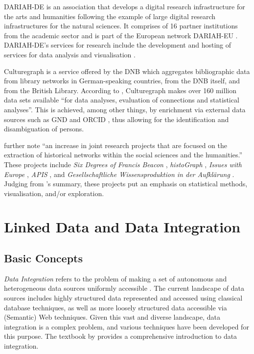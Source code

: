 DARIAH-DE \autocite{DariahDE} is an association that develops
a digital research infrastructure for the arts and humanities
following the example of large digital research infrastructures for the natural sciences.
It comprises of 16 partner institutions from the academic sector
and is part of the European network DARIAH-EU \autocite{DariahEU}.
DARIAH-DE's services for research include
the development and hosting of services for data analysis and visualisation
\autocite{WikiDariahDE}.

Culturegraph \autocite{Vorndran2018,Culturegraph} is a service offered by the
\gls{DNB} which aggregates bibliographic data 
from library networks in German-speaking countries,
from the \gls{DNB} itself, and from the British Library.
According to \textcite{Vorndran2018}, Culturegraph makes over 160 million data sets
available \enquote{for data analyses, evaluation of connections and statistical analyses}.
This is achieved, among other things,
by enrichment via external data sources such as \gls{GND}
and ORCID \autocite{ORCID}, thus allowing for the identification
and disambiguation of persons.

\textcite{Menzel2020} further note \enquote{an increase in joint research projects
that are focused on the extraction of historical networks within the social sciences and the humanities.}
These projects include \emph{Six Degrees of Francis Beacon} \autocite{Warren2016,SixDegreesFB},
\emph{histoGraph} \autocite{Novak2014,histograph},
\emph{Issues with Europe} \autocite{IssuesWithEurope},
\emph{APIS} \autocite{Gruber2017,APIS},
and \emph{\foreignlanguage{ngerman}{Gesellschaftliche Wissensproduktion in der Aufklärung}} \autocite{Purschwitz2018}.
Judging from \citeauthor*{Menzel2020}'s \autocite*{Menzel2020} summary,
these projects put an emphasis on statistical methods,
visualisation, and/or exploration.

\section{Linked Data and Data Integration}
\label{sec:linked_data+integration}

\subsection{Basic Concepts}
\label{subsec:LOD_basic_concepts}

\emph{Data Integration} refers to the problem of making a set of autonomous and heterogeneous data sources
uniformly accessible \autocite[p.6]{Doan2012}.
The current landscape of data sources includes highly structured data
represented and accessed using classical database techniques,
as well as more loosely structured data accessible via (Semantic) Web techniques.
Given this vast and diverse landscape, data integration is a complex problem,
and various techniques have been developed for this purpose.
The textbook by \textcite{Doan2012} provides a
comprehensive introduction to data integration.

